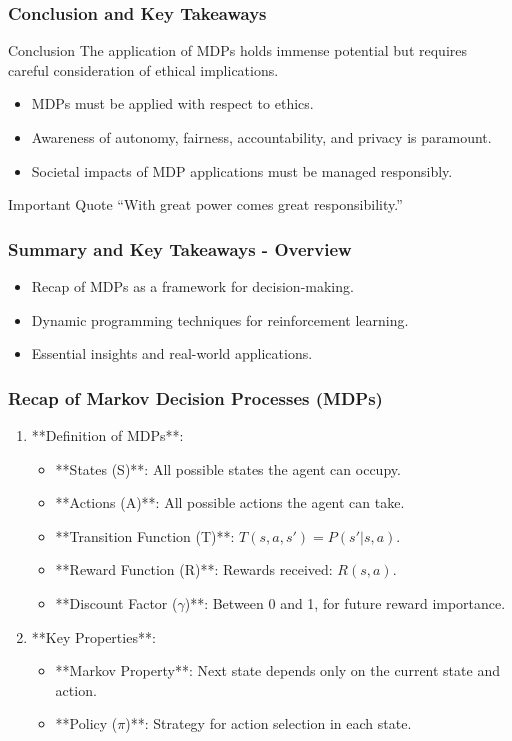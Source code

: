 \documentclass{beamer}
\begin{document}
\begin{frame}[fragile]
    \frametitle{Conclusion and Key Takeaways}
    \begin{block}{Conclusion}
        The application of MDPs holds immense potential but requires careful consideration of ethical implications.
    \end{block}
    \begin{itemize}
        \item MDPs must be applied with respect to ethics.
        \item Awareness of autonomy, fairness, accountability, and privacy is paramount.
        \item Societal impacts of MDP applications must be managed responsibly.
    \end{itemize}
    
    \begin{block}{Important Quote}
        “With great power comes great responsibility.”
    \end{block}
\end{frame}

\begin{frame}[fragile]
    \frametitle{Summary and Key Takeaways - Overview}
    \begin{itemize}
        \item Recap of MDPs as a framework for decision-making.
        \item Dynamic programming techniques for reinforcement learning.
        \item Essential insights and real-world applications.
    \end{itemize}
\end{frame}

\begin{frame}[fragile]
    \frametitle{Recap of Markov Decision Processes (MDPs)}
    \begin{enumerate}
        \item **Definition of MDPs**:
        \begin{itemize}
            \item **States (S)**: All possible states the agent can occupy.
            \item **Actions (A)**: All possible actions the agent can take.
            \item **Transition Function (T)**: \( T(s, a, s') = P(s' | s, a) \).
            \item **Reward Function (R)**: Rewards received: \( R(s, a) \).
            \item **Discount Factor ($\gamma$)**: Between 0 and 1, for future reward importance.
        \end{itemize}
        \item **Key Properties**:
        \begin{itemize}
            \item **Markov Property**: Next state depends only on the current state and action.
            \item **Policy ($\pi$)**: Strategy for action selection in each state.
        \end{itemize}
    \end{enumerate}
\end{frame}
\end{document}
